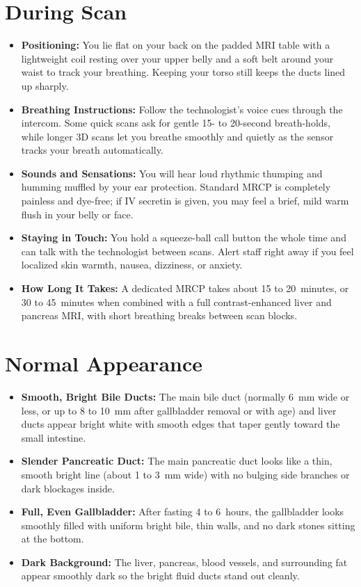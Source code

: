 \section{During Scan}
\begin{itemize}
\item \textbf{Positioning:} You lie flat on your back on the padded MRI table with a lightweight coil resting over your upper belly and a soft belt around your waist to track your breathing. Keeping your torso still keeps the ducts lined up sharply.
\item \textbf{Breathing Instructions:} Follow the technologist's voice cues through the intercom. Some quick scans ask for gentle 15- to 20-second breath-holds, while longer 3D scans let you breathe smoothly and quietly as the sensor tracks your breath automatically.
\item \textbf{Sounds and Sensations:} You will hear loud rhythmic thumping and humming muffled by your ear protection. Standard MRCP is completely painless and dye-free; if IV secretin is given, you may feel a brief, mild warm flush in your belly or face.
\item \textbf{Staying in Touch:} You hold a squeeze-ball call button the whole time and can talk with the technologist between scans. Alert staff right away if you feel localized skin warmth, nausea, dizziness, or anxiety.
\item \textbf{How Long It Takes:} A dedicated MRCP takes about 15 to 20~minutes, or 30 to 45~minutes when combined with a full contrast-enhanced liver and pancreas MRI, with short breathing breaks between scan blocks.
\end{itemize}

\section{Normal Appearance}
\begin{itemize}
\item \textbf{Smooth, Bright Bile Ducts:} The main bile duct (normally 6~mm wide or less, or up to 8 to 10~mm after gallbladder removal or with age) and liver ducts appear bright white with smooth edges that taper gently toward the small intestine.
\item \textbf{Slender Pancreatic Duct:} The main pancreatic duct looks like a thin, smooth bright line (about 1 to 3~mm wide) with no bulging side branches or dark blockages inside.
\item \textbf{Full, Even Gallbladder:} After fasting 4 to 6~hours, the gallbladder looks smoothly filled with uniform bright bile, thin walls, and no dark stones sitting at the bottom.
\item \textbf{Dark Background:} The liver, pancreas, blood vessels, and surrounding fat appear smoothly dark so the bright fluid ducts stand out cleanly.
\end{itemize}

